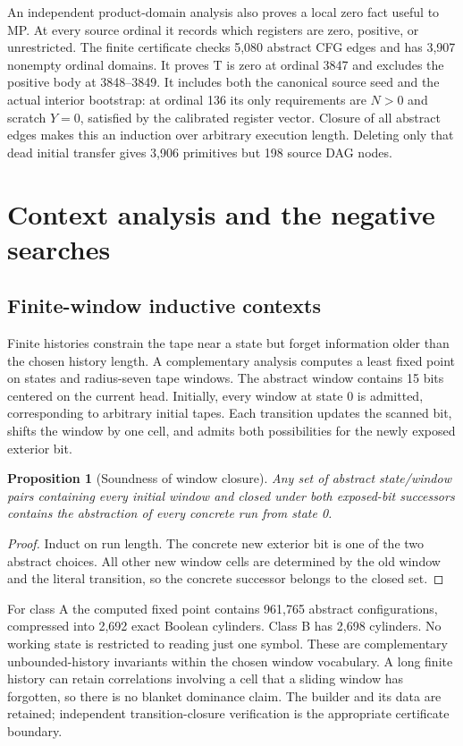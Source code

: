 \documentclass[11pt,a4paper]{article}
\newtheorem{proposition}[theorem]{Proposition}
\begin{document}
An independent product-domain analysis also proves a local zero fact useful
to MP. At every source ordinal it records which registers are zero, positive,
or unrestricted. The finite certificate checks 5,080 abstract CFG edges and
has 3,907 nonempty ordinal domains. It proves T is zero at ordinal 3847 and
excludes the positive body at 3848--3849. It includes both the canonical
source seed and the actual interior bootstrap: at ordinal 136 its only
requirements are $N>0$ and scratch $Y=0$, satisfied by the calibrated register
vector. Closure of all abstract edges makes this an induction over arbitrary
execution length. Deleting only that dead initial transfer gives 3,906
primitives but 198 source DAG nodes.

\section{Context analysis and the negative searches}

\subsection{Finite-window inductive contexts}

Finite histories constrain the tape near a state but forget information
older than the chosen history length. A complementary analysis computes a
least fixed point on states and radius-seven tape windows. The abstract
window contains 15 bits centered on the current head. Initially, every
window at state 0 is admitted, corresponding to arbitrary initial tapes.
Each transition updates the scanned bit, shifts the window by one cell,
and admits both possibilities for the newly exposed exterior bit.

\begin{proposition}[Soundness of window closure]
Any set of abstract state/window pairs containing every initial window and
closed under both exposed-bit successors contains the abstraction of every
concrete run from state 0.
\end{proposition}
\begin{proof}
Induct on run length. The concrete new exterior bit is one of the two
abstract choices. All other new window cells are determined by the old
window and the literal transition, so the concrete successor belongs to
the closed set.
\end{proof}

For class A the computed fixed point contains 961,765 abstract configurations,
compressed into 2,692 exact Boolean cylinders. Class B has 2,698 cylinders.
No working state is restricted to reading just one symbol. These are
complementary unbounded-history invariants within the chosen window
vocabulary. A long finite history can retain correlations involving a cell
that a sliding window has forgotten, so there is no blanket dominance claim.
The builder and its data are retained; independent transition-closure
verification is the appropriate certificate boundary.
\end{document}

